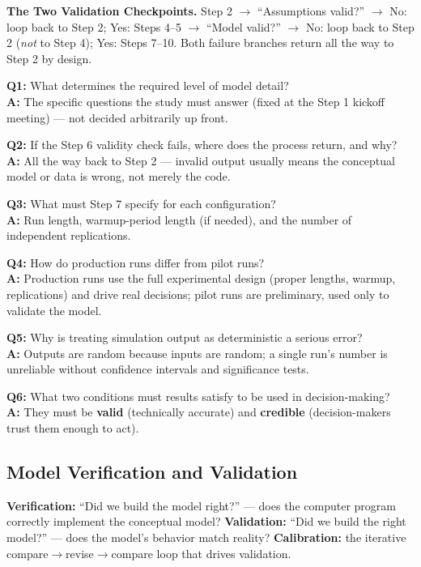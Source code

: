 \begin{examplebox}
\textbf{The Two Validation Checkpoints.} Step 2 $\to$ ``Assumptions valid?'' $\to$ No: loop back to Step 2; Yes: Steps 4--5 $\to$ ``Model valid?'' $\to$ No: loop back to Step 2 (\emph{not} to Step 4); Yes: Steps 7--10. Both failure branches return all the way to Step 2 by design.
\end{examplebox}

\begin{qabox}
\textbf{Q1:} What determines the required level of model detail? \\
\textbf{A:} The specific questions the study must answer (fixed at the Step 1 kickoff meeting) — not decided arbitrarily up front.

\textbf{Q2:} If the Step 6 validity check fails, where does the process return, and why? \\
\textbf{A:} All the way back to Step 2 — invalid output usually means the conceptual model or data is wrong, not merely the code.

\textbf{Q3:} What must Step 7 specify for each configuration? \\
\textbf{A:} Run length, warmup-period length (if needed), and the number of independent replications.

\textbf{Q4:} How do production runs differ from pilot runs? \\
\textbf{A:} Production runs use the full experimental design (proper lengths, warmup, replications) and drive real decisions; pilot runs are preliminary, used only to validate the model.

\textbf{Q5:} Why is treating simulation output as deterministic a serious error? \\
\textbf{A:} Outputs are random because inputs are random; a single run's number is unreliable without confidence intervals and significance tests.

\textbf{Q6:} What two conditions must results satisfy to be used in decision-making? \\
\textbf{A:} They must be \textbf{valid} (technically accurate) and \textbf{credible} (decision-makers trust them enough to act).
\end{qabox}

\subsection{Model Verification and Validation}

\begin{defbox}
\textbf{Verification:} ``Did we build the model right?'' — does the computer program correctly implement the conceptual model? \textbf{Validation:} ``Did we build the right model?'' — does the model's behavior match reality? \textbf{Calibration:} the iterative compare$\to$revise$\to$compare loop that drives validation.
\end{defbox}


